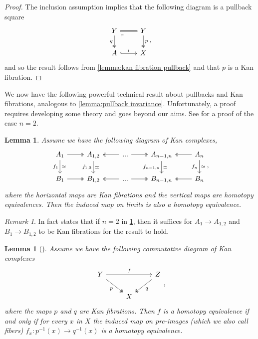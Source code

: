 \documentclass[11pt, a4paper]{amsart}
\newtheorem{lemma}[equation]{Lemma}
\theoremstyle{definition}
\theoremstyle{remark}
\newtheorem{remark}[equation]{Remark}
\numberwithin{equation}{section}
\begin{document}
\begin{proof}
  The inclusion assumption implies that the following diagram is a pullback square
  \[
    \begin{tikzcd}
      Y \arrow[r, equal] \arrow[d, "q"', twoheadrightarrow] \arrow[dr, phantom, "\ulcorner", very near start] & Y \arrow[d, "p", twoheadrightarrow] \\
      A \arrow[r, "i", hookrightarrow] & X
    \end{tikzcd},
  \]
  and so the result follows from \cref{lemma:kan fibration pullback} and that $p$ is a Kan fibration.
\end{proof}


We now have the following powerful technical result about pullbacks and Kan fibrations, analogous to \cref{lemma:pullback invariance}. Unfortunately, a proof requires developing some theory and goes beyond our aims. See \cite[Proposition 13.3.9]{hirschhorn2003modelcategories} for a proof of the case $n=2$.

\begin{lemma} \label{lemma:homotopy pullback}
 Assume we have the following diagram of Kan complexes,
   \[ 
  \begin{tikzcd}
   A_1 \arrow[r, twoheadrightarrow] \arrow[d, "\simeq", "f_1"'] & A_{1,2} \arrow[d, "\simeq", "f_{1,2}"'] & ... \arrow[r, twoheadrightarrow] \arrow[l, twoheadrightarrow] & A_{n-1,n} \arrow[d, "\simeq", "f_{n-1,n}"'] & A_n \arrow[d, "\simeq", "f_n"'] \arrow[l, twoheadrightarrow] \\ 
   B_1 \arrow[r, twoheadrightarrow] & B_{1,2} & ... \arrow[r, twoheadrightarrow] \arrow[l, twoheadrightarrow] & B_{n-1,n} & B_n \arrow[l, twoheadrightarrow]
  \end{tikzcd},
  \]
 where the horizontal maps are Kan fibrations and the vertical maps are homotopy equivalences. Then the induced map on limits is also a homotopy equivalence.
\end{lemma}

\begin{remark} \label{rem:homotopy pullback}
 In fact \cite[Proposition 13.3.9]{hirschhorn2003modelcategories} states that if $n =2$ in \cref{lemma:homotopy pullback}, then it suffices for $A_1 \to A_{1,2}$ and $B_1 \to B_{1,2}$ to be Kan fibrations for the result to hold.
\end{remark}

\begin{lemma}[{\cite[\href{https://kerodon.net/tag/00XC}{Proposition 00XC}]{lurie2026kerodon}}] \label{lemma:homotopy pullback preimage}
  Assume we have the following commutative diagram of Kan complexes
  \[
  \begin{tikzcd}
   Y \arrow[rr, "f"] \arrow[dr, "p"', twoheadrightarrow] & & Z \arrow[dl, "q", twoheadrightarrow] \\ 
   & X 
  \end{tikzcd},
  \] 
  where the maps $p$ and $q$ are Kan fibrations. Then $f$ is a homotopy equivalence if and only if for every $x$ in $X$ the induced map on pre-images (which we also call fibers) $f_x\colon p^{-1}(x) \to q^{-1}(x)$ is a homotopy equivalence.
\end{lemma}
\end{document}
